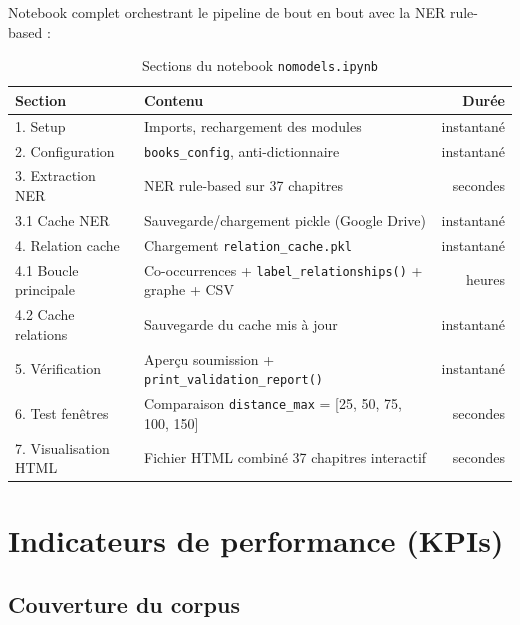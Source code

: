 \documentclass[a4paper,11pt]{article}
\begin{document}
Notebook complet orchestrant le pipeline de bout en bout avec la NER rule-based :

\begin{table}[H]
  \centering
  \footnotesize
  \begin{tabular}{llr}
    \toprule
    \textbf{Section} & \textbf{Contenu} & \textbf{Durée} \\
    \midrule
    1. Setup              & Imports, rechargement des modules                       & instantané \\
    2. Configuration      & \texttt{books\_config}, anti-dictionnaire               & instantané \\
    3. Extraction NER     & NER rule-based sur 37 chapitres                         & secondes \\
    3.1 Cache NER         & Sauvegarde/chargement pickle (Google Drive)             & instantané \\
    4. Relation cache     & Chargement \texttt{relation\_cache.pkl}                 & instantané \\
    4.1 Boucle principale & Co-occurrences + \texttt{label\_relationships()} + graphe + CSV & heures \\
    4.2 Cache relations   & Sauvegarde du cache mis à jour                          & instantané \\
    5. Vérification       & Aperçu soumission + \texttt{print\_validation\_report()} & instantané \\
    6. Test fenêtres      & Comparaison \texttt{distance\_max} = [25, 50, 75, 100, 150] & secondes \\
    7. Visualisation HTML & Fichier HTML combiné 37 chapitres interactif            & secondes \\
    \bottomrule
  \end{tabular}
  \caption{Sections du notebook \texttt{nomodels.ipynb}}
\end{table}

\section{Indicateurs de performance (KPIs)}

\subsection{Couverture du corpus}
\end{document}
